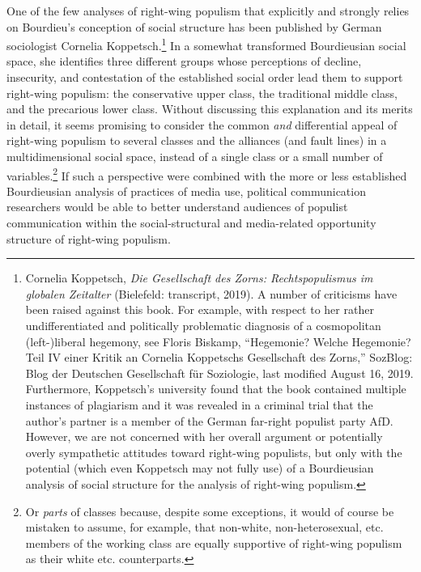 \documentclass{tufte-handout}
\begin{document}
One of the few analyses of right-wing populism that explicitly and
strongly relies on Bourdieu's conception of social structure has been
published by German sociologist Cornelia Koppetsch.\footnote{Cornelia
  Koppetsch, \emph{Die Gesellschaft des Zorns: Rechtspopulismus im
  globalen Zeitalter} (Bielefeld: transcript, 2019). A number of
  criticisms have been raised against this book. For example, with
  respect to her rather undifferentiated and politically problematic
  diagnosis of a cosmopolitan (left-)liberal hegemony, see Floris
  Biskamp, ``Hegemonie? Welche Hegemonie? Teil IV einer Kritik an
  Cornelia Koppetschs Gesellschaft des Zorns,'' SozBlog: Blog der
  Deutschen Gesellschaft für Soziologie, last modified August 16, 2019.
  Furthermore, Koppetsch's university found that the book contained
  multiple instances of plagiarism and it was revealed in a criminal
  trial that the author's partner is a member of the German far-right
  populist party AfD. However, we are not concerned with her overall
  argument or potentially overly sympathetic attitudes toward right-wing
  populists, but only with the potential (which even Koppetsch may not
  fully use) of a Bourdieusian analysis of social structure for the
  analysis of right-wing populism.} In a somewhat transformed
Bourdieusian social space, she identifies three different groups whose
perceptions of decline, insecurity, and contestation of the established
social order lead them to support right-wing populism: the conservative
upper class, the traditional middle class, and the precarious lower
class. Without discussing this explanation and its merits in detail, it
seems promising to consider the common \emph{and} differential appeal of
right-wing populism to several classes and the alliances (and fault
lines) in a multidimensional social space, instead of a single class or
a small number of variables.\footnote{Or \emph{parts} of classes
  because, despite some exceptions, it would of course be mistaken to
  assume, for example, that non-white, non-heterosexual, etc. members of
  the working class are equally supportive of right-wing populism as
  their white etc. counterparts.} If such a perspective were combined
with the more or less established Bourdieusian analysis of practices of
media use, political communication researchers would be able to better
understand audiences of populist communication within the
social-structural and media-related opportunity structure of right-wing
populism.
\end{document}

